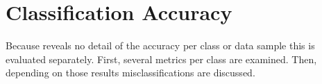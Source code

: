 \section{Classification Accuracy}
\label{sec:results-predictions}
Because  reveals no detail of the accuracy per class or data sample this is evaluated separately.
First, several metrics per class are examined.
Then, depending on those results misclassifications are discussed.


